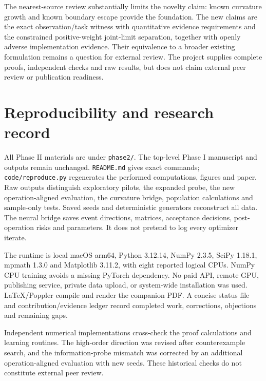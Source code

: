 \documentclass[11pt]{article}
\theoremstyle{remark}\newtheorem{remark}[theorem]{Remark}
\begin{document}
The nearest-source review substantially limits the novelty claim: known
curvature growth and known boundary escape provide the foundation. The new
claims are the exact observation/task witness with quantitative evidence
requirements and the constrained positive-weight joint-limit separation,
together with openly adverse implementation evidence. Their equivalence
to a broader existing formulation remains a question for external review.
The project supplies complete proofs, independent checks and raw results,
but does not claim external peer review or publication readiness.

\section{Reproducibility and research record}
All Phase II materials are under \texttt{phase2/}. The top-level Phase I
manuscript and outputs remain unchanged. \texttt{README.md} gives exact
commands; \texttt{code/reproduce.py} regenerates the performed computations,
figures and paper. Raw outputs distinguish exploratory pilots, the expanded
probe, the new operation-aligned evaluation, the curvature bridge, population
calculations and sample-only tests. Saved seeds and deterministic generators
reconstruct all data. The neural bridge saves event directions, matrices,
acceptance decisions, post-operation risks and parameters. It does not
pretend to log every optimizer iterate.

The runtime is local macOS arm64, Python 3.12.14, NumPy 2.3.5,
SciPy 1.18.1, mpmath 1.3.0 and Matplotlib 3.11.2, with eight reported
logical CPUs. NumPy CPU training avoids a missing PyTorch dependency.
No paid API, remote GPU, publishing service, private data upload, or
system-wide installation was used. LaTeX/Poppler compile and render the
companion PDF. A concise status file and contribution/evidence ledger
record completed work, corrections, objections and remaining gaps.

Independent numerical implementations cross-check the proof calculations and
learning routines. The high-order direction was revised after counterexample
search, and the information-probe mismatch was corrected by an additional
operation-aligned evaluation with new seeds. These historical checks do not
constitute external peer review.



\end{document}
